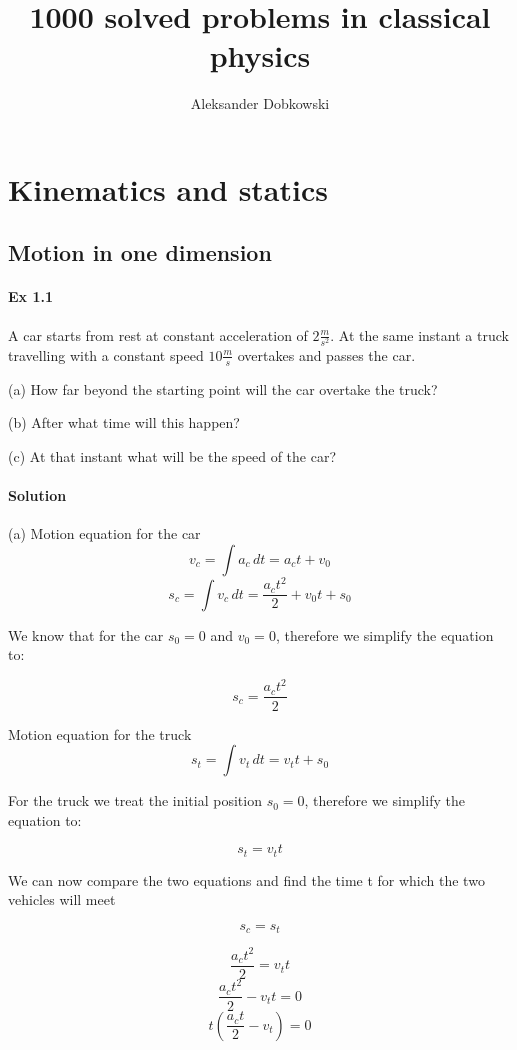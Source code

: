 \documentclass{article}
\title{1000 solved problems in classical physics}
\author{Aleksander Dobkowski}
\date{}
\begin{document}
\maketitle

\section{Kinematics and statics}
\subsection{Motion in one dimension}


\paragraph{Ex 1.1}
A car starts from rest at constant acceleration of $2\frac{m}{s^2}$. At the same instant a truck travelling with a constant speed $10\frac{m}{s}$ overtakes and passes the car.

(a) How far beyond the starting point will the car overtake the truck?

(b) After what  time will this happen?

(c) At that instant what will be the speed of the car?
\paragraph{Solution\\}
(a) Motion equation for the car
\[ v_c = \int a_c \, dt = a_ct + v_0 \]
\[ s_c = \int v_c \, dt = \frac{a_ct^2}{2} + v_0t + s_0 \]

We know that for the car $s_0 = 0$ and $v_0 = 0$, therefore we simplify the equation to:

\[ s_c = \frac{a_ct^2}{2} \]

Motion equation for the truck
\[ s_t = \int v_t \, dt = v_tt + s_0 \]

For the truck we treat the initial position $s_0 = 0$, therefore we simplify the equation to:

\[ s_t = v_tt \]

We can now compare the two equations and find the time t for which the two vehicles will meet

\[ s_c = s_t \]

\[ \frac{a_ct^2}{2} = v_t t \]
\[ \frac{a_ct^2}{2} - v_tt = 0 \]
\[ t \left( \frac{a_ct}{2} - v_t \right) = 0 \]
\end{document}
